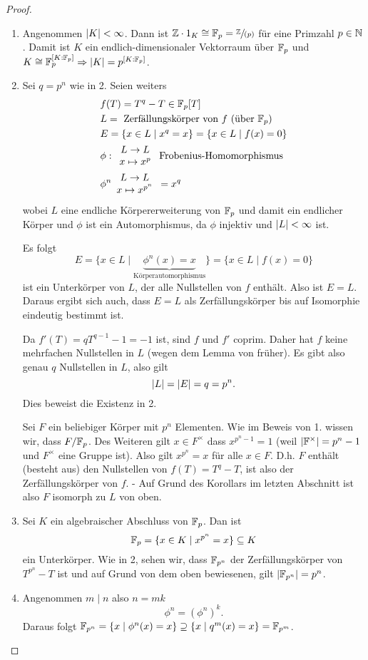 \begin{proof}
	\begin{enumerate}[1)]
		\item Angenommen $\abs{K} < \infty$. Dann ist $\mathbb{Z} \cdot 1_{K} \cong \mathbb{F}_{p} = \sfrac{\mathbb{Z}}{(p)}$ für eine Primzahl $p \in \mathbb{N}$.
			Damit ist $K$ ein endlich-dimensionaler Vektorraum über $\mathbb{F}_{p}$ und $K \cong  \mathbb{F}_{p}^{[K : \mathbb{F}_{p}]} \Rightarrow  \abs{K} = p^{[K : \mathbb{F}_{p}]}$.
		\item Sei $q = p^{n}$ wie in 2. Seien weiters
			\begin{align*}
				&f(T) = T^{q}- T \in \mathbb{F}_{p}[T]\\
				&L =  \text{ Zerfällungskörper von $f$ (über $\mathbb{F}_p$)}\\
				&E = \{x \in L \mid x^{q} = x\} = \{x \in L \mid f(x) = 0\} \\
				&\phi: \begin{array}{c} L \to L\\ x \mapsto x^{p}\\ \end{array} \text{ Frobenius-Homomorphismus }\\
				&\phi^{n} \begin{array}{c} L \to L\\ x \mapsto x^{p^{n}}\\ \end{array} = x^{q}
			\end{align*}
			wobei $L$ eine endliche Körpererweiterung von $\mathbb{F}_{p}$ und damit ein endlicher Körper und $\phi$ ist ein Automorphismus, da $\phi$ injektiv und $\abs{L} < \infty$ ist.

			Es folgt
			\[
				E = \{x \in L \mid \underbrace{\phi^{n}(x) = x}_{\text{Körperautomorphismus}}\} = \{ x \in L \mid f(x) = 0\} 
			\] 
			ist ein Unterkörper von $L$, der alle Nullstellen von $f$ enthält. Also ist $E = L$.
			Daraus ergibt sich auch, dass $E = L$ als Zerfällungskörper bis auf Isomorphie eindeutig bestimmt ist.

			Da $f'(T) = q T^{q-1} -1 = -1$ ist, sind $f$ und $f'$ coprim.
			Daher hat $f$ keine mehrfachen Nullstellen in $L$ (wegen dem Lemma von früher).
			Es gibt also genau $q$ Nullstellen in $L$, also gilt 
			\[
			\abs{L} = \abs{E}= q = p^{n}
			.\] 
			Dies beweist die Existenz  in  2.

			Sei $F$ ein beliebiger Körper mit $p^{n}$ Elementen. Wie im Beweis von 1. wissen wir, dass $F / \mathbb{F}_{p}$.
			Des Weiteren gilt $x \in F^{\times}$ dass $x^{p^{n}-1} = 1$ (weil $\abs{\mathbb{F}^{\times }} = p^{n}-1$ und $F^{\times}$ eine Gruppe ist).
			Also gilt $x^{p^{n}} = x$ für alle $x \in F$.
			D.h. $F$ enthält (besteht aus) den Nullstellen von $f(T) = T^{q} - T$,
			ist also der Zerfällungskörper von $f$. - Auf Grund des Korollars im letzten Abschnitt ist also $F$ isomorph 
			zu $L$ von oben.
		\item Sei $K$ ein algebraischer Abschluss von $\mathbb{F}_{p}$. Dan ist
			\[
			\mathbb{F}_{p} = \{ x \in K \mid x^{p^{n}} = x\} \subseteq K
			\] 
			ein Unterkörper. Wie in 2, sehen wir, dass $\mathbb{F}_{p^{n}}$ der Zerfällungskörper von $T^{p^{n}} - T$ ist und
			auf Grund von dem oben bewiesenen, gilt $\abs{\mathbb{F}_{p^{n}}} = p^{n}$.
		\item Angenommen $m \mid n$ also $n  = m k$ 
			\[
				\phi^{n} = \left( \phi^{n} \right)^{k}
			.\] 
			Daraus folgt $\mathbb{F}_{p^{n}} = \{x \mid \phi^{n}(x) = x\} \supseteq \{x \mid q^{m}(x) = x\} = \mathbb{F}_{p^{m}}$.


\end{enumerate}
\end{proof}
